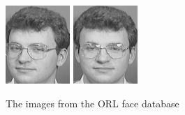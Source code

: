 \begin{figure}[ht]
 \includegraphics[width=\columnwidth/11]{ch3/figures/s6_9.png}
 \includegraphics[width=\columnwidth/11]{ch3/figures/s6_10.png}\\
\caption{The images from the ORL face database}
\label{fig:orl}
\end{figure} 
